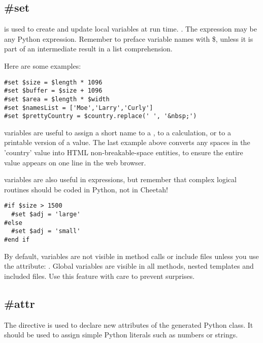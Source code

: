 \subsection{\#set}
\label{inheritanceEtc.set}

 is used to create and update local variables at run time.
. The expression may be any Python expression.
Remember to preface variable names with \$, unless it is part of an
intermediate result in a list comprehension.

Here are some examples:
\begin{verbatim}
#set $size = $length * 1096
#set $buffer = $size + 1096
#set $area = $length * $width
#set $namesList = ['Moe','Larry','Curly']
#set $prettyCountry = $country.replace(' ', '&nbsp;')
\end{verbatim}

 variables are useful to assign a short name to a
, to a calculation, or to a printable version of
a value.  The last example above converts any spaces in the 'country' value
into HTML non-breakable-space entities, to ensure the entire value appears on
one line in the web browser.

 variables are also useful in  expressions, but
remember that complex logical routines should be coded in Python, not in
Cheetah!
\begin{verbatim}
#if $size > 1500
  #set $adj = 'large'
#else
  #set $adj = 'small'
#end if
\end{verbatim}

By default,  variables are not visible in method calls or include
files unless you use the  attribute: .  Global variables are visible in all methods, nested templates and
included files.  Use this feature with care to prevent surprises.


\subsection{\#attr}
\label{inheritanceEtc.attr}

The  directive is used to declare new attributes of the generated Python
class.  It should be used to assign simple Python literals such as numbers or
strings.  

